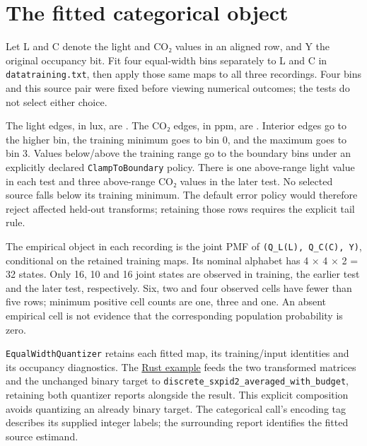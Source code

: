 \par{}

\section{The fitted categorical object}\label{the-fitted-categorical-object}

Let L and C denote the light and CO₂ values in an aligned row, and Y the original occupancy bit. Fit four equal-width bins separately to L and C in \texttt{datatraining.txt}, then apply those same maps to all three recordings. Four bins and this source pair were fixed before viewing numerical outcomes; the tests do not select either choice.

The light edges, in lux, are \mbox{\PidSavedTexttt{[0,}}\allowbreak\space \mbox{}\allowbreak\space \mbox{}\allowbreak\space \mbox{}\allowbreak\space \mbox{\PidSavedTexttt{1546.33333333333]}}. The CO₂ edges, in ppm, are \mbox{\PidSavedTexttt{[412.75,}}\allowbreak\space \mbox{}\allowbreak\space \mbox{}\allowbreak\space \mbox{}\allowbreak\space \mbox{\PidSavedTexttt{2028.5]}}. Interior edges go to the higher bin, the training minimum goes to bin 0, and the maximum goes to bin 3. Values below/above the training range go to the boundary bins under an explicitly declared \texttt{ClampToBoundary} policy. There is one above-range light value in each test and three above-range CO₂ values in the later test. No selected source falls below its training minimum. The default error policy would therefore reject affected held-out transforms; retaining those rows requires the explicit tail rule.

The empirical object in each recording is the joint PMF of \texttt{(Q\_L(L),\ Q\_C(C),\ Y)}, conditional on the retained training maps. Its nominal alphabet has 4 × 4 × 2 = 32 states. Only 16, 10 and 16 joint states are observed in training, the earlier test and the later test, respectively. Six, two and four observed cells have fewer than five rows; minimum positive cell counts are one, three and one. An absent empirical cell is not evidence that the corresponding population probability is zero.

\texttt{EqualWidthQuantizer} retains each fitted map, its training/input identities and its occupancy diagnostics. The \href{https://github.com/sepahead/pid-rs/blob/main/crates/pid-core/examples/occupancy_sensors.rs}{Rust example} feeds the two transformed matrices and the unchanged binary target to \texttt{discrete\_sxpid2\_averaged\_with\_budget}, retaining both quantizer reports alongside the result. This explicit composition avoids quantizing an already binary target. The categorical call's encoding tag describes its supplied integer labels; the surrounding report identifies the fitted source estimand.

